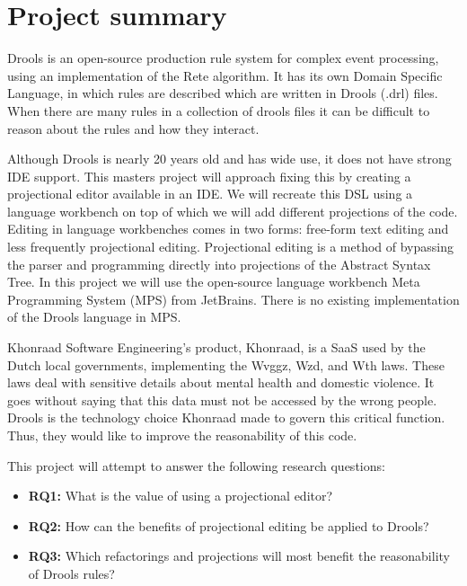 \section{Project summary}

Drools\cite{browne2009jboss} is an open-source production rule system for complex event processing, using an implementation of the Rete algorithm\cite{forgy1989rete}.
It has its own Domain Specific Language, in which rules are described which are written in Drools (.drl) files.
When there are many rules in a collection of drools files it can be difficult to reason about the rules and how they interact.

Although Drools is nearly 20 years old and has wide use, it does not have strong IDE support.
This masters project will approach fixing this by creating a projectional editor available in an IDE.
We will recreate this DSL using a language workbench on top of which we will add different projections of the code.
Editing in language workbenches comes in two forms: free-form text editing and less frequently projectional editing\cite{erdweg2013state}.
Projectional editing is a method of bypassing the parser and programming directly into projections of the Abstract Syntax Tree.
In this project we will use the open-source language workbench Meta Programming System (MPS) from JetBrains\cite{MPS_ProductPage}.
There is no existing implementation of the Drools language in MPS.

Khonraad Software Engineering's product, Khonraad, is a SaaS used by the Dutch local governments, implementing the Wvggz, Wzd, and Wth laws. 
These laws deal with sensitive details about mental health and domestic violence.
It goes without saying that this data must not be accessed by the wrong people.
Drools is the technology choice Khonraad made to govern this critical function.
Thus, they would like to improve the reasonability of this code.

This project will attempt to answer the following research questions:
\begin{itemize}
    \item \textbf{RQ1:}\label{RQ1} What is the value of using a projectional editor?
    \item \textbf{RQ2:}\label{RQ2} How can the benefits of projectional editing be applied to Drools?
    \item \textbf{RQ3:}\label{RQ3} Which refactorings and projections will most benefit the reasonability of Drools rules?
\end{itemize}